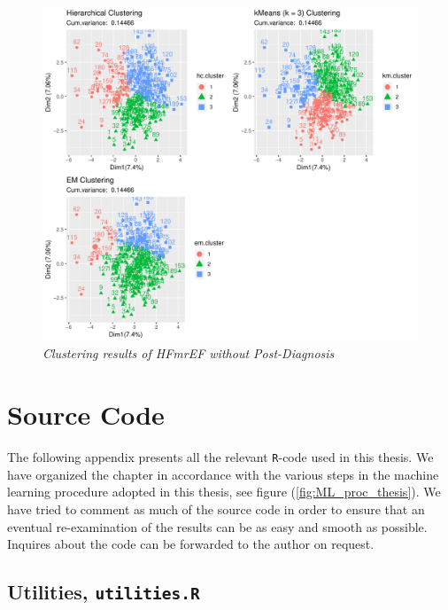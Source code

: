 \documentclass[../thesis.tex]{subfiles}
\begin{document}
\newpage

\begin{figure}[h!]
    \centering
    \hspace*{-1cm}\includegraphics[width=1.1\textwidth]{doc/thesis/images/ClustmrNoPhy.pdf}
    \caption[Clustering results of HFmrEF without Post-Diagnosis]{\textit{Clustering results of HFmrEF \textit{without} Post-Diagnosis}}
    \label{fig:clust_results_without_post_mr}
\end{figure}

\chapter{Source Code}
\label{chap:souce_code}

\noindent The following appendix presents all the relevant \texttt{R}-code used in this thesis. We have organized the chapter in accordance with the various steps in the machine learning procedure adopted in this thesis, see figure (\ref{fig:ML_proc_thesis}). We have tried to comment as much of the source code in order to ensure that an eventual re-examination of the results can be as easy and smooth as possible. Inquires about the code can be forwarded to the author on request.

\section{Utilities, \texttt{utilities.R}}
\label{sec:utilities}
\end{document}
